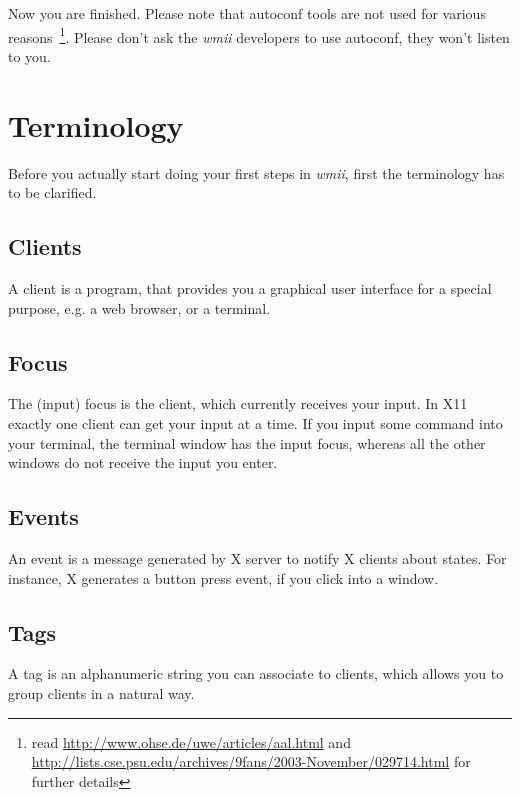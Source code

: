 \documentclass[12pt,a4paper]{article} %
\newcommand{\hrefx}[1]{\href{#1}{#1}} %
\newcommand{\wmii}{\emph{wmii}}
\begin{document}
    Now you are finished. Please note that autoconf tools are not used
    for various reasons~\footnote{ read
      \hrefx{http://www.ohse.de/uwe/articles/aal.html} and
      \hrefx{http://lists.cse.psu.edu/archives/9fans/2003-November/029714.html}
      for further details}. Please don't ask the \wmii{} developers to use autoconf,
    they won't listen to you.


    \section{Terminology}
    \label{sec:terms}  

    Before you actually start doing your first steps in \wmii, first the
    terminology has to be clarified.

    \subsection{Clients}

    A client is a program, that provides you a graphical user interface for
    a special purpose, e.g. a web browser, or a terminal.
    
    \subsection{Focus}

    The (input) focus is the client, which currently receives your input.
    In X11 exactly one client can get your input at a time. If you input
    some command into your terminal, the terminal window has the input focus,
    whereas all the other windows do not receive the input you enter.
    
    \subsection{Events}

    An event is a message generated by X server to notify X clients about
    states. For instance,  X generates a button press event, if you click
    into a window.
    
    \subsection{Tags}

    A tag is an alphanumeric string you can associate to clients,
    which allows you to group clients in a natural way.
    
\end{document}
